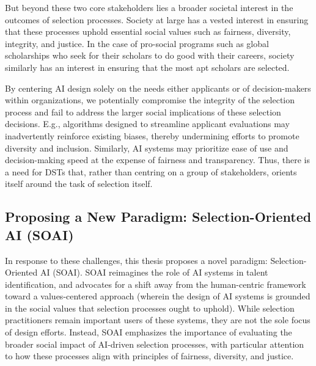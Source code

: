 But beyond these two core stakeholders lies a broader societal interest in the outcomes of selection processes. Society at large has a vested interest in ensuring that these processes uphold essential social values such as fairness, diversity, integrity, and justice. In the case of pro-social programs such as global scholarships who seek for their scholars to do good with their careers, society similarly has an interest in ensuring that the most apt scholars are selected.

By centering AI design solely on the needs either applicants or of decision-makers within organizations, we potentially compromise the integrity of the selection process and fail to address the larger social implications of these selection decisions. E.g., algorithms designed to streamline applicant evaluations may inadvertently reinforce existing biases, thereby undermining efforts to promote diversity and inclusion. Similarly, AI systems may prioritize ease of use and decision-making speed at the expense of fairness and transparency. Thus, there is a need for DSTs that, rather than centring on a group of stakeholders, orients itself around the task of selection itself.

\subsection{Proposing a New Paradigm: Selection-Oriented AI (SOAI)}
In response to these challenges, this thesis proposes a novel paradigm: Selection-Oriented AI (SOAI). SOAI reimagines the role of AI systems in talent identification, and advocates for a shift away from the human-centric framework toward a values-centered approach (wherein the design of AI systems is grounded in the social values that selection processes ought to uphold). While selection practitioners remain important users of these systems, they are not the sole focus of design efforts. Instead, SOAI emphasizes the importance of evaluating the broader social impact of AI-driven selection processes, with particular attention to how these processes align with principles of fairness, diversity, and justice. %


